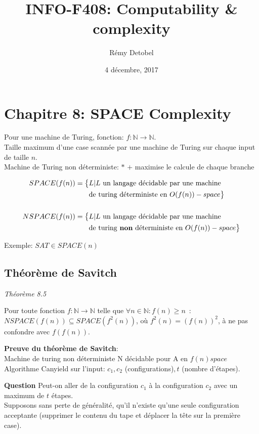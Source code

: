 \documentclass[a4paper,12pt]{article}
\title{INFO-F408: Computability \& complexity}
\date{4 décembre, 2017}
\author{Rémy Detobel}
\begin{document}
\maketitle
\newpage

\section{Chapitre 8: SPACE Complexity}
  Pour une machine de Turing, fonction: $f: \mathbb{N} \rightarrow \mathbb{N}$.\\
  Taille maximum d'une case scannée par une machine de Turing sur chaque input de taille $n$.\\

  Machine de Turing non déterministe: $*$ $+$ maximise le calcule de chaque branche

  \begin{align*}
    SPACE(f(n)) = \big\{&L | L \text{ un langage décidable par une machine}\\
    &\text{de turing déterministe en } O(f(n))-space \big\}\\
    \\
    NSPACE(f(n)) = \big\{&L | L \text{ un langage décidable par une machine}\\
    &\text{de turing \textbf{non} déterministe en } O(f(n))-space \big\}
  \end{align*}

  Exemple: $SAT \in SPACE(n)$

  \subsection{Théorème de Savitch}
    \textit{Théorème 8.5}
    \begin{theoremeBox}
      Pour toute fonction $f : \mathbb N \to \mathbb N$ telle que $\forall n \in \mathbb N : f(n) \geq n$~:\\
      $NSPACE(f(n)) \subseteq SPACE(f^2(n))$, où $f^2(n) = (f(n))^2$, à ne pas confondre avec $f(f(n))$.
    \end{theoremeBox}

    \textbf{Preuve du théorème de Savitch}:\\
    Machine de turing non déterministe N décidable pour A en $f(n) space$\\
    Algorithme Canyield sur l'input: $c_1, c_2$ (configurations)$, t$ (nombre d'étapes).

    \textbf{Question} Peut-on aller de la configuration $c_1$ à la configuration $c_2$ avec un maximum de $t$ étapes.\\
    Supposons sans perte de généralité, qu'il n'existe qu'une seule configuration acceptante
		(supprimer le contenu du tape et déplacer la tête sur la première case).\\
  
\end{document}
